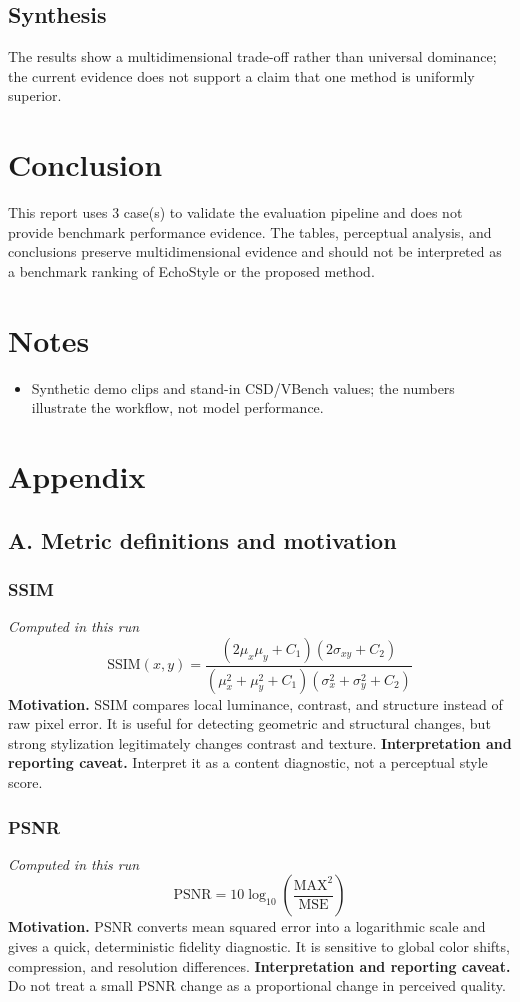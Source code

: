 \documentclass[10pt]{article}
\begin{document}
\subsection*{Synthesis}
The results show a multidimensional trade-off rather than universal dominance; the current evidence does not support a claim that one method is uniformly superior.
\section*{Conclusion}
This report uses 3 case(s) to validate the evaluation pipeline and does not provide benchmark performance evidence. The tables, perceptual analysis, and conclusions preserve multidimensional evidence and should not be interpreted as a benchmark ranking of EchoStyle or the proposed method.
\section*{Notes}
\begin{itemize}
\item Synthetic demo clips and stand-in CSD/VBench values; the numbers illustrate the workflow, not model performance.
\end{itemize}
\clearpage
\section*{Appendix}
\subsection*{A. Metric definitions and motivation}
\subsubsection*{SSIM}
\textit{Computed in this run}
\begin{equation*}
\mathrm{SSIM}(x,y)=\frac{(2\mu_x\mu_y+C_1)(2\sigma_{xy}+C_2)}{(\mu_x^2+\mu_y^2+C_1)(\sigma_x^2+\sigma_y^2+C_2)}
\end{equation*}
\textbf{Motivation.} SSIM compares local luminance, contrast, and structure instead of raw pixel error. It is useful for detecting geometric and structural changes, but strong stylization legitimately changes contrast and texture.
\textbf{Interpretation and reporting caveat.} Interpret it as a content diagnostic, not a perceptual style score.
\subsubsection*{PSNR}
\textit{Computed in this run}
\begin{equation*}
\mathrm{PSNR}=10\log_{10}\!\left(\frac{\mathrm{MAX}^2}{\mathrm{MSE}}\right)
\end{equation*}
\textbf{Motivation.} PSNR converts mean squared error into a logarithmic scale and gives a quick, deterministic fidelity diagnostic. It is sensitive to global color shifts, compression, and resolution differences.
\textbf{Interpretation and reporting caveat.} Do not treat a small PSNR change as a proportional change in perceived quality.
\end{document}

